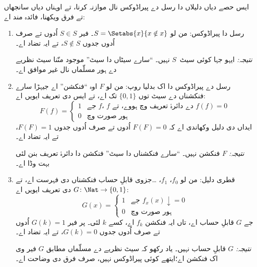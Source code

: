 \documentclass[../../../include/open-logic-section]{subfiles}
\begin{document}

ایس حصے دیاں دلیلاں دا رسل دے پیراڈوکس نال موازنہ کرنا،
تے اوہناں دیاں سانجھاں تے فرق ویکھنا، فائدہ مند اے:
\begin{enumerate}
\item رسل دا پیراڈوکس: من لو $S = \Setabs{x}{x \notin x}$۔
فیر $S
  \in S$ اُدوں تے صرف اُدوں جدوں $S \notin S$،
  تے ایہ تضاد اے۔

  \emph{نتیجہ:} ایہو جہا کوئی سیٹ~$S$ نہیں۔ ``سارے سیٹاں
  دا سیٹ'' موجود منّنا سیٹ نظریے دے ہور مسلّماں نال
  غیر موافق اے۔

\item رسل دے پیراڈوکس دا اک بدلیا روپ: من لو $F$ اوہ ``فنکشن''
  اے جیہڑا سارے فنکشناں دے سیٹ توں $\{ 0, 1 \}$ تک اے،
  تے ایس دی تعریف ایویں اے:
  \[
  F(f) =
  \begin{cases}
    1 & \text{جے $f$، $f$ دے دائرۂ تعریف وچ ہووے، تے $f(f) = 0$} \\
    0 & \text{ہور صورت وچ}
  \end{cases}
  \]
  ایداں دی دلیل وکھاندی اے کہ $F(F) = 0$ اُدوں تے صرف
  اُدوں جدوں $F(F) = 1$، تے ایہ تضاد اے۔

  \emph{نتیجہ:} $F$ فنکشن نہیں۔ ``سارے فنکشناں دا سیٹ''
  فنکشن دا دائرۂ تعریف بنن لئی بہت وڈا اے۔

\item قطری دلیل: من لو $f_0$، $f_1$، \dots جزوی قابلِ حساب
  فنکشناں دی فہرست اے، تے $G \colon \Nat \to
  \{ 0, 1 \}$ دی تعریف ایویں اے:
  \[
  G(x) =
  \begin{cases}
    1 & \text{جے $f_x(x)\downarrow = 0$} \\
    0 & \text{ہور صورت وچ}
  \end{cases}
  \]
  جے $G$ قابلِ حساب اے، تاں ایہ فنکشن $f_k$ اے،
  کسے $k$ لئی۔ پر فیر $G(k) = 1$ اُدوں تے صرف اُدوں
  جدوں $G(k) = 0$، تے ایہ تضاد اے۔

  \emph{نتیجہ:} $G$ قابلِ حساب نہیں۔ یاد رکھو کہ سیٹ نظریے
  دے مسلّماں مطابق $G$ فیر وی اک فنکشن اے؛ایتھے کوئی
  پیراڈوکس نہیں، صرف فرق دی وضاحت اے۔
\end{enumerate}
\end{document}
